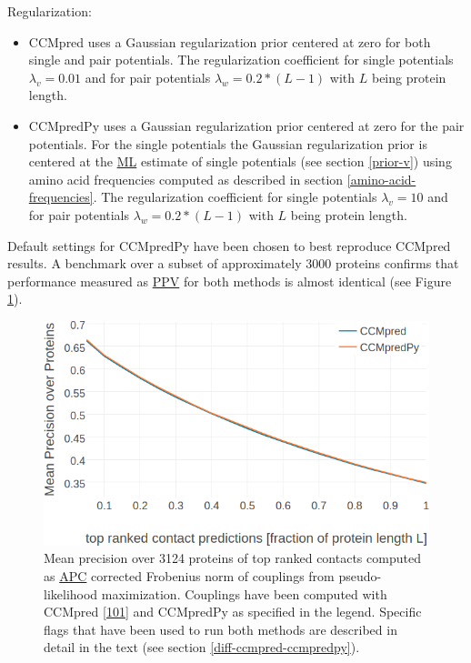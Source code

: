 \documentclass[11pt,a4paper,twoside]{book}
\providecommand{\tightlist}{%
  \setlength{\itemsep}{0pt}\setlength{\parskip}{0pt}}
\theoremstyle{definition}
\theoremstyle{definition}
\theoremstyle{remark}
\begin{document}
Regularization:

\begin{itemize}
\tightlist
\item
  CCMpred uses a Gaussian regularization prior centered at zero for both
  single and pair potentials. The regularization coefficient for single
  potentials \(\lambda_v = 0.01\) and for pair potentials
  \(\lambda_w = 0.2 * (L-1)\) with \(L\) being protein length.
\item
  CCMpredPy uses a Gaussian regularization prior centered at zero for
  the pair potentials. For the single potentials the Gaussian
  regularization prior is centered at the \protect\hyperlink{abbrev}{ML}
  estimate of single potentials (see section \ref{prior-v}) using amino
  acid frequencies computed as described in section
  \ref{amino-acid-frequencies}. The regularization coefficient for
  single potentials \(\lambda_v = 10\) and for pair potentials
  \(\lambda_w = 0.2 * (L-1)\) with \(L\) being protein length.
\end{itemize}

Default settings for CCMpredPy have been chosen to best reproduce
CCMpred results. A benchmark over a subset of approximately 3000
proteins confirms that performance measured as
\protect\hyperlink{abbrev}{PPV} for both methods is almost identical
(see Figure \ref{fig:cmmpredvanilla-vs-ccmpredpy}).










\begin{figure}
\includegraphics[width=0.9\linewidth]{img/methods/ccmpredvanilla_vs_ccmpredpy_precision_vs_rank} \caption{Mean precision over 3124
proteins of top ranked contacts computed as
\protect\hyperlink{abbrev}{APC} corrected Frobenius norm of couplings
from pseudo-likelihood maximization. Couplings have been computed with
CCMpred {[}\protect\hyperlink{ref-Seemayer2014}{101}{]} and CCMpredPy as
specified in the legend. Specific flags that have been used to run both
methods are described in detail in the text (see section
\ref{diff-ccmpred-ccmpredpy}).}\label{fig:cmmpredvanilla-vs-ccmpredpy}
\end{figure}
\end{document}

